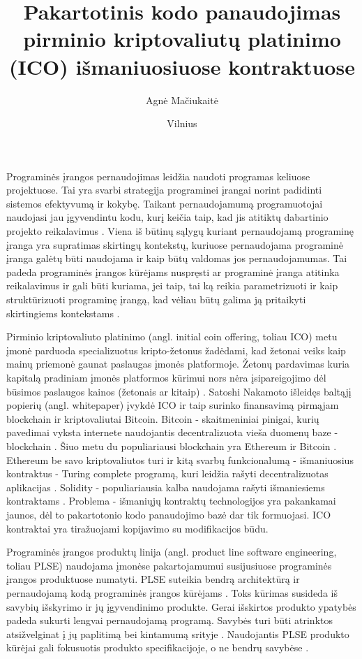 \documentclass{VUMIFPSkursinis}
\title{Pakartotinis kodo panaudojimas pirminio kriptovaliutų platinimo (ICO) išmaniuosiuose kontraktuose}
\author{Agnė Mačiukaitė}
\date{Vilnius \\ \the\year}
\begin{document}
\maketitle

\tableofcontents


 \label{ivadas}

Programinės įrangos pernaudojimas leidžia naudoti programas keliuose projektuose. Tai yra svarbi strategija programinei įrangai norint padidinti sistemos efektyvumą ir kokybę. Taikant pernaudojamumą programuotojai naudojasi jau įgyvendintu kodu, kurį keičia taip, kad jis atitiktų dabartinio projekto reikalavimus \cite {Ravichandran2003}. Viena iš būtinų sąlygų kuriant pernaudojamą programinę įranga yra supratimas skirtingų kontekstų, kuriuose pernaudojama programinė įranga galėtų būti naudojama ir kaip būtų valdomas jos pernaudojamumas. Tai padeda programinės įrangos kūrėjams nuspręsti ar programinė įranga atitinka reikalavimus ir gali būti kuriama, jei taip, tai ką reikia parametrizuoti ir kaip struktūrizuoti programinę įrangą, kad vėliau būtų galima ją pritaikyti skirtingiems kontekstams \cite{Kang1990}.

Pirminio kriptovaliuto platinimo (angl. initial coin offering, toliau ICO) metu įmonė parduoda specializuotus kripto-žetonus žadėdami, kad žetonai veiks kaip mainų priemonė gaunat paslaugas įmonės platformoje. Žetonų pardavimas kuria kapitalą pradiniam įmonės platformos kūrimui nors nėra įsipareigojimo dėl būsimos paslaugos kainos (žetonais ar kitaip) \cite{Catalini2018}. Satoshi Nakamoto išleidęs baltąjį popierių (angl. whitepaper) \cite{Nakamoto2008} įvykdė ICO  ir taip surinko finansavimą pirmąjam blockchain ir kriptovaliutai Bitcoin. Bitcoin - skaitmeniniai pinigai, kurių pavedimai vyksta internete naudojantis decentralizuota vieša duomenų baze - blockchain \cite{Swan2015}. Šiuo metu du populiariausi blockchain yra Ethereum ir Bitcoin \cite{Luu}. Ethereum be savo kriptovaliutos turi ir kitą svarbų funkcionalumą - išmaniuosius kontraktus - Turing complete programą, kuri leidžia rašyti decentralizuotas aplikacijas \cite{Buterin2014}. Solidity - populiariausia kalba naudojama rašyti išmaniesiems kontraktams \cite{Dannen}. Problema - išmaniųjų kontraktų technologijos yra pakankamai jaunos, dėl to pakartotonio kodo panaudojimo bazė dar tik formuojasi. ICO kontraktai yra tiražuojami kopijavimo su modifikacijos būdu.

Programinės įrangos produktų linija (angl. product line software engineering, toliau PLSE) naudojama įmonėse pakartojamumui susijusiuose programinės įrangos produktuose numatyti. PLSE suteikia bendrą architektūrą ir pernaudojamą kodą programinės įrangos kūrėjams \cite{Svahnberg}. Toks kūrimas susideda iš savybių išskyrimo ir jų įgyvendinimo produkte. Gerai išskirtos produkto ypatybės padeda sukurti lengvai pernaudojamą programą. Savybės turi būti atrinktos atsižvelginat į jų paplitimą bei kintamumą srityje \cite{Lee2015}. Naudojantis PLSE produkto kūrėjai gali fokusuotis produkto specifikacijoje, o ne bendrų savybėse \cite{Svahnberg}.
\end{document}
